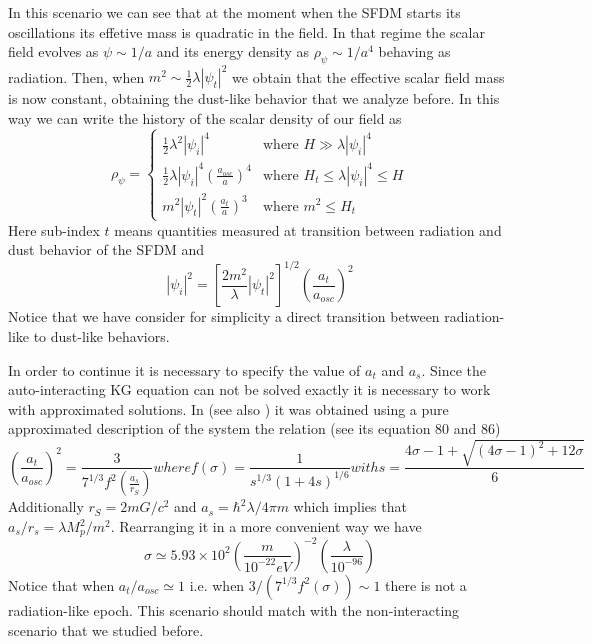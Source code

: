 \documentclass[amssymb,twocolumn,prd,nofootinbib,showpacs]{revtex4-1}
\begin{document}
\begin{itemize}
In this scenario we can see that at the moment when the SFDM starts its oscillations its effetive mass is quadratic in the field. In that regime the scalar field evolves as $\psi\sim 1/a$ and its energy density as $\rho_{\psi}\sim 1/a^4$ behaving as radiation. Then, when $m^2 \sim \frac{1}{2}\lambda|\psi_t|^2$ we obtain that the effective scalar field mass is now constant, obtaining the dust-like behavior that we analyze before. In this way we can write the history of the scalar density of our field as
\begin{equation}\label{rhosfdmlam}
\rho_\psi = \left\lbrace\begin{array}{ll}
\frac{1}{2}\lambda^2|\psi_i|^4 & \text{where }H\gg \lambda|\psi_i|^4 \\
\frac{1}{2}\lambda|\psi_i|^4\left(\frac{a_{osc}}{a}\right)^4 & \text{where }H_t\leq \lambda|\psi_i|^4\leq H\\
m^2|\psi_t|^2\left(\frac{a_t}{a}\right)^3 & \text{where } m^2\leq H_t
\end{array}\right .
\end{equation}
Here sub-index $t$ means quantities measured at transition between radiation and dust behavior of the SFDM and
\begin{equation}\label{inilamb}
|\psi_i|^2=\left[\frac{2m^2}{\lambda}|\psi_t|^2\right]^{1/2}\left(\frac{a_t}{a_{osc}}\right)^2
\end{equation}
Notice that we have consider for simplicity a direct transition between radiation-like to dust-like behaviors. 

In order to continue it is necessary to specify the value of $a_t$ and $a_s$. Since the auto-interacting KG equation can not be solved exactly it is necessary to work with approximated solutions. In \cite{SFphi42} (see also \cite{SFphi41}) it was obtained using a pure approximated description of the system the relation (see its equation 80 and 86)
\begin{subequations}
\begin{equation}\label{atoveras}
\left(\frac{a_t}{a_{osc}}\right)^2=\frac{3}{7^{1/3}f^2(\frac{a_s}{r_S})}
\end{equation}
where 
\begin{equation}
f(\sigma)=\frac{1}{s^{1/3}(1+4s)^{1/6}}
\end{equation}
with
\begin{equation}
s=\frac{4\sigma-1+\sqrt{(4\sigma-1)^2+12\sigma}}{6}
\end{equation}
\end{subequations}
Additionally $r_S=2mG/c^2$ and $a_s=\hbar^2\lambda/4\pi m$ which implies that $a_s/r_s=\lambda M_p^2/m^2$. Rearranging it in a more convenient way we have
\begin{equation}
\sigma \simeq 5.93\times 10^{
2}\left(\frac{m}{10^{-22}eV}\right)^{-2}\left(\frac{\lambda}{10^{-96}}\right)
\end{equation}
Notice that when $a_t/a_{osc}\simeq 1$ i.e. when $3/(7^{1/3}f^2(\sigma))\sim 1$ there is not a radiation-like epoch. This scenario should match with the non-interacting scenario that we studied before.


\end{itemize}
\end{document}
